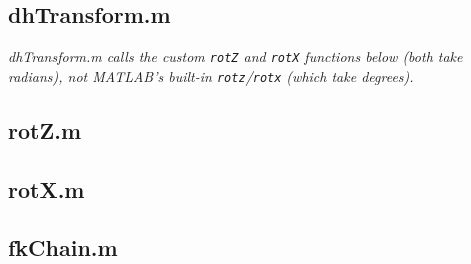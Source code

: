 \documentclass[11pt]{article}
\begin{document}
\newpage
\subsection*{dhTransform.m}
\noindent\textit{dhTransform.m calls the custom \texttt{rotZ} and \texttt{rotX} functions below (both take radians), not MATLAB's built-in \texttt{rotz}/\texttt{rotx} (which take degrees).}

\newpage
\subsection*{rotZ.m}

\newpage
\subsection*{rotX.m}

\newpage
\subsection*{fkChain.m}
\end{document}
